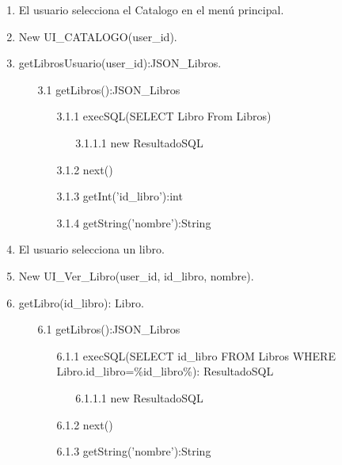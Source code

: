 ﻿\documentclass{report}
\begin{document}
        \begin{enumerate}
            \item El usuario selecciona el Catalogo en el menú principal.
            \item New UI\_CATALOGO(user\_id).
            \item getLibrosUsuario(user\_id):JSON\_Libros.
            \clearpage
            \begin{enumerate}
                \item [3.1] getLibros():JSON\_Libros
                \begin{enumerate}
                    \item [3.1.1] execSQL(SELECT Libro From Libros)
                    \begin{enumerate}
                        \item [3.1.1.1] new ResultadoSQL
                    \end{enumerate}               
                    \item [3.1.2] next()
                    \item [3.1.3] getInt('id\_libro'):int
                    \item [3.1.4] getString('nombre'):String
                \end{enumerate}
            \end{enumerate}
            \item El usuario selecciona un libro.
            \item New UI\_Ver\_Libro(user\_id, id\_libro, nombre).
            \item getLibro(id\_libro): Libro.
            \begin{enumerate}
                \item [6.1] getLibros():JSON\_Libros
                \begin{enumerate}
                   \item [6.1.1]  execSQL(SELECT id\_libro FROM Libros WHERE Libro.id\_libro=\%id\_libro\%): ResultadoSQL
                   \begin{enumerate}
                        \item [6.1.1.1] new ResultadoSQL
                    \end{enumerate}               
                    \item [6.1.2] next()
                    \item [6.1.3] getString('nombre'):String
                \end{enumerate}

\end{enumerate}
\end{enumerate}
\end{document}
